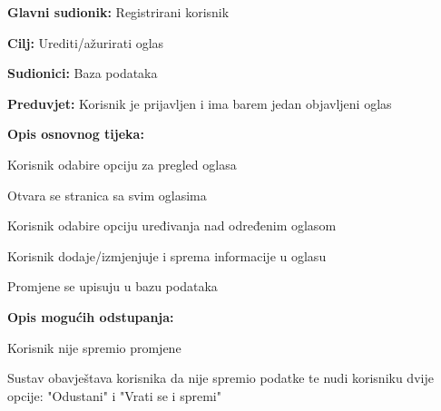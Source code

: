 				\noindent {}
					\begin{packed_item}
	
						\item \textbf{Glavni sudionik: }Registrirani korisnik
						\item  \textbf{Cilj:} Urediti/ažurirati oglas
						\item  \textbf{Sudionici:} Baza podataka
						\item  \textbf{Preduvjet:} Korisnik je prijavljen i ima barem jedan objavljeni oglas
						\item  \textbf{Opis osnovnog tijeka:}
						
						\item[] \begin{packed_enum}
	
							\item Korisnik odabire opciju za pregled oglasa
							\item Otvara se stranica sa svim oglasima
							\item Korisnik odabire opciju uređivanja nad određenim oglasom
							\item Korisnik dodaje/izmjenjuje i sprema informacije u oglasu
							\item Promjene se upisuju u bazu podataka

						\end{packed_enum}		
						
						\item  \textbf{Opis mogućih odstupanja:}
						
						\item[] \begin{packed_item}
	
							\item[4.a] Korisnik nije spremio promjene
								\begin{packed_item}
									\item Sustav obavještava korisnika da nije spremio podatke te nudi korisniku dvije opcije: "Odustani" i "Vrati se i spremi"
								\end{packed_item}
								
						\end{packed_item}				
					\end{packed_item}
					
